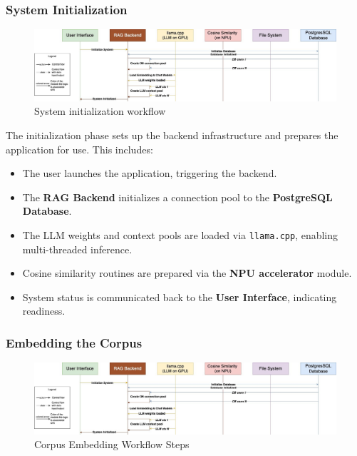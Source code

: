 \subsubsection{System Initialization}
\label{subsec:AppDesignWorkflow-SystemInitialization}

\begin{figure}[H]
    \centering
    \includegraphics[width=1.0\linewidth]{images/tldr-app-worklfow-pt1.jpg}
    \caption{System initialization workflow}
    \label{fig:tldrsysteminitworkflow}
\end{figure}


The initialization phase sets up the backend infrastructure and prepares the application for use. This includes:

\begin{itemize}
    \item The user launches the application, triggering the backend.
    \item The \textbf{RAG Backend} initializes a connection pool to the \textbf{PostgreSQL Database}.
    \item The LLM weights and context pools are loaded via \texttt{llama.cpp}, enabling multi-threaded inference.
    \item Cosine similarity routines are prepared via the \textbf{NPU accelerator} module.
    \item System status is communicated back to the \textbf{User Interface}, indicating readiness.
\end{itemize}


\subsubsection{Embedding the Corpus}
\label{subsec:AppDesignWorkflow-EmbeddingCorpus}

\begin{figure}[H]
    \centering
    \includegraphics[width=1.0\linewidth]{images/tldr-app-worklfow-pt1.jpg}
    \caption{Corpus Embedding Workflow Steps}
    \label{fig:corpusembedworkflowsteps}
\end{figure}

